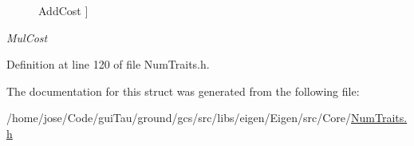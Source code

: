 \begin{Desc}
\begin{description}
{\hypertarget{struct_num_traits_3_01long_01double_01_4_a7d44fc654578e5eba7d7dc40271b7c1fadd95669a80db8b5ea3a050edf42409f1}{Add\-Cost}\label{struct_num_traits_3_01long_01double_01_4_a7d44fc654578e5eba7d7dc40271b7c1fadd95669a80db8b5ea3a050edf42409f1}
}]\item[{\em 
\hypertarget{struct_num_traits_3_01long_01double_01_4_a7d44fc654578e5eba7d7dc40271b7c1fa1df54ec18ff72f8243f8a6d8adc05df0}{Mul\-Cost}\label{struct_num_traits_3_01long_01double_01_4_a7d44fc654578e5eba7d7dc40271b7c1fa1df54ec18ff72f8243f8a6d8adc05df0}
}]\end{description}
\end{Desc}


Definition at line 120 of file Num\-Traits.\-h.



The documentation for this struct was generated from the following file\-:\begin{DoxyCompactItemize}
\item 
/home/jose/\-Code/gui\-Tau/ground/gcs/src/libs/eigen/\-Eigen/src/\-Core/\hyperlink{_num_traits_8h}{Num\-Traits.\-h}\end{DoxyCompactItemize}
